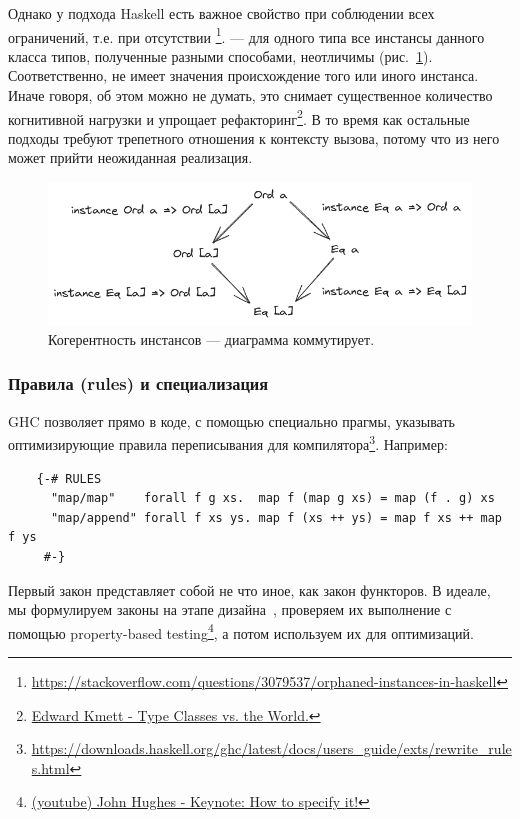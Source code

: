 Однако у подхода Haskell есть важное свойство при соблюдении всех ограничений, т.е. при отсутствии \footnote{\url{https://stackoverflow.com/questions/3079537/orphaned-instances-in-haskell}}.
 --- для одного типа все инстансы данного класса типов, полученные разными способами, неотличимы (рис.~\ref{fig:coherence}).
Соответственно, не имеет значения происхождение того или иного инстанса.
Иначе говоря, об этом можно не думать, это снимает существенное количество когнитивной нагрузки и упрощает рефакторинг\footnote{\href{https://youtu.be/hIZxTQP1ifo?si=aG2Lk2eb-5E5SOLb}{Edward Kmett - Type Classes vs. the World.}}.
В то время как остальные подходы требуют трепетного отношения к контексту вызова, потому что из него может прийти неожиданная реализация.

\begin{figure}
    \centering
    \includegraphics[width=0.8\linewidth]{figs/coherence}
    \caption{Когерентность инстансов --- диаграмма коммутирует.}
    \label{fig:coherence}
\end{figure}

\subsubsection{Правила (rules) и специализация}

GHC позволяет прямо в коде, с помощью специально прагмы, указывать оптимизирующие правила переписывания для компилятора\footnote{\url{https://downloads.haskell.org/ghc/latest/docs/users_guide/exts/rewrite_rules.html}}.
Например:
\begin{verbatim}
    {-# RULES
      "map/map"    forall f g xs.  map f (map g xs) = map (f . g) xs
      "map/append" forall f xs ys. map f (xs ++ ys) = map f xs ++ map f ys
     #-}
\end{verbatim}

Первый закон представляет собой не что иное, как закон функторов.
В идеале, мы формулируем законы на этапе дизайна~\cite{maguire-algebra}, проверяем их выполнение с помощью property-based testing\footnote{\href{https://youtu.be/G0NUOst-53U?si=vdcKVUi9vSPBY0Jz}{(youtube) John Hughes - Keynote: How to specify it!}}, а потом используем их для оптимизаций.

